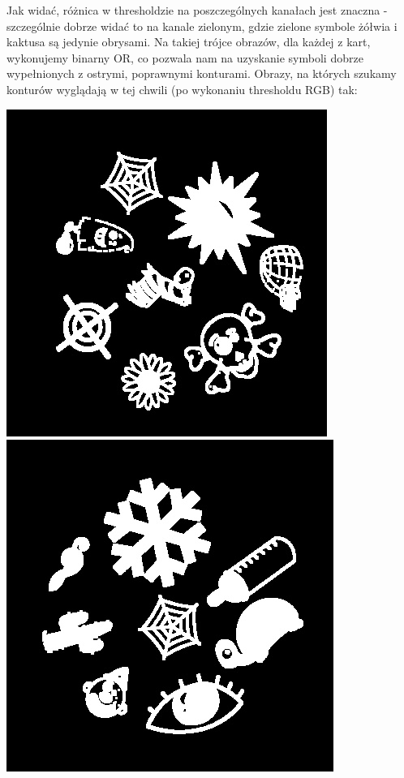\documentclass[10pt,a4paper]{article}
\begin{document}
Jak widać, różnica w thresholdzie na poszczególnych kanałach jest znaczna - szczególnie dobrze widać to na kanale zielonym, gdzie zielone symbole żółwia i kaktusa są jedynie obrysami. Na takiej trójce obrazów, dla każdej z kart, wykonujemy binarny OR, co pozwala nam na uzyskanie symboli dobrze wypełnionych z ostrymi, poprawnymi konturami. Obrazy, na których szukamy konturów wyglądają w tej chwili (po wykonaniu thresholdu RGB) tak:\\
\begin{center}
\includegraphics[scale=0.25]{2.1/0.jpg}
\includegraphics[scale=0.25]{2.1/1.jpg}

\end{center}
\end{document}
